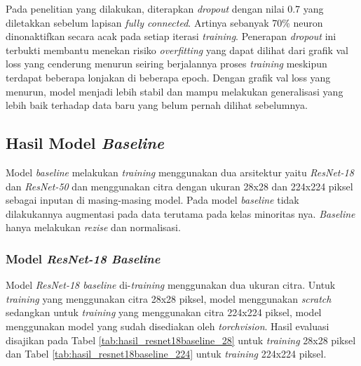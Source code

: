 Pada penelitian yang dilakukan, diterapkan \textit{dropout} dengan nilai 
0.7 yang diletakkan sebelum lapisan \textit{fully connected}. Artinya 
sebanyak 70\% neuron dinonaktifkan secara acak pada setiap iterasi 
\textit{training}. Penerapan \textit{dropout} ini terbukti membantu 
menekan risiko \textit{overfitting} yang dapat dilihat dari grafik val loss 
yang cenderung menurun seiring berjalannya proses \textit{training} 
meskipun terdapat beberapa lonjakan di beberapa epoch. Dengan grafik val 
loss yang menurun, model menjadi lebih stabil dan mampu melakukan 
generalisasi yang lebih baik terhadap data baru yang belum pernah dilihat 
sebelumnya. \par

\subsection{Hasil Model \textit{Baseline}} \label{IV.Baseline}
Model \textit{baseline} melakukan \textit{training} menggunakan dua 
arsitektur yaitu \textit{ResNet-18} dan \textit{ResNet-50} dan menggunakan 
citra dengan ukuran 28x28 dan 224x224 piksel sebagai inputan di 
masing-masing model. Pada model \textit{baseline} tidak dilakukannya 
augmentasi pada data terutama pada kelas minoritas nya. \textit{Baseline} 
hanya melakukan \textit{rezise} dan normalisasi. \par

\subsubsection{Model \textit{ResNet-18 Baseline}} \label{IV.Resnet18_Baseline}
Model \textit{ResNet-18 baseline} di-\textit{training} menggunakan dua 
ukuran citra. Untuk \textit{training} yang menggunakan citra 28x28 piksel, 
model menggunakan \textit{scratch} sedangkan untuk \textit{training} 
yang menggunakan citra 224x224 piksel, model menggunakan model yang sudah 
disediakan oleh \textit{torchvision}. Hasil evaluasi disajikan pada Tabel 
\ref{tab:hasil_resnet18baseline_28} untuk \textit{training} 28x28 piksel 
dan Tabel \ref{tab:hasil_resnet18baseline_224} untuk \textit{training} 
224x224 piksel. \par 


